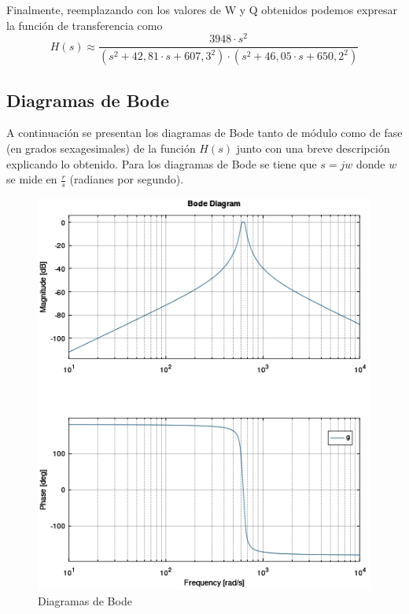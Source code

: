 \documentclass[11pt,a4paper]{report}
\begin{document}
\bigskip
Finalmente, reemplazando con los valores de W y Q obtenidos podemos expresar la función de transferencia como
\[H(s) \approx \frac{3948 \cdot s^2}{(s^2+42,81 \cdot s + 607,3^2)
\cdot (s^2+46,05 \cdot s + 650,2^2)}\]

\subsection*{Diagramas de Bode}
A continuación se presentan los diagramas de Bode tanto de módulo como de fase (en grados sexagesimales) de la función $H(s)$ junto con una breve descripción explicando
lo obtenido. Para los diagramas de Bode se tiene que $s=jw$ donde $w$ se mide
en $\frac{r}{s}$ (radianes por segundo).

\begin{figure}[h!]
\includegraphics[scale=0.7]{DiagramasBode.png}
\caption{Diagramas de Bode}
\end{figure}
\end{document}
